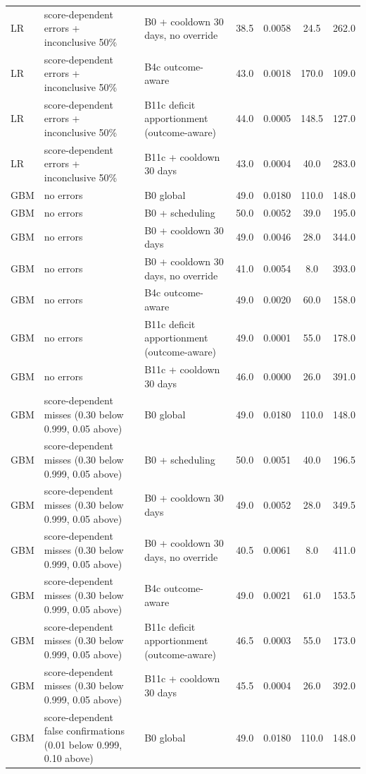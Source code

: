 \begin{longtable}{lp{5.2cm}p{4.4cm}cccc}
LR & score-dependent errors + inconclusive 50\% & B0 + cooldown 30 days, no override & 38.5 & 0.0058 & 24.5 & 262.0 \\
LR & score-dependent errors + inconclusive 50\% & B4c outcome-aware & 43.0 & 0.0018 & 170.0 & 109.0 \\
LR & score-dependent errors + inconclusive 50\% & B11c deficit apportionment (outcome-aware) & 44.0 & 0.0005 & 148.5 & 127.0 \\
LR & score-dependent errors + inconclusive 50\% & B11c + cooldown 30 days & 43.0 & 0.0004 & 40.0 & 283.0 \\
GBM & no errors & B0 global & 49.0 & 0.0180 & 110.0 & 148.0 \\
GBM & no errors & B0 + scheduling & 50.0 & 0.0052 & 39.0 & 195.0 \\
GBM & no errors & B0 + cooldown 30 days & 49.0 & 0.0046 & 28.0 & 344.0 \\
GBM & no errors & B0 + cooldown 30 days, no override & 41.0 & 0.0054 & 8.0 & 393.0 \\
GBM & no errors & B4c outcome-aware & 49.0 & 0.0020 & 60.0 & 158.0 \\
GBM & no errors & B11c deficit apportionment (outcome-aware) & 49.0 & 0.0001 & 55.0 & 178.0 \\
GBM & no errors & B11c + cooldown 30 days & 46.0 & 0.0000 & 26.0 & 391.0 \\
GBM & score-dependent misses (0.30 below 0.999, 0.05 above) & B0 global & 49.0 & 0.0180 & 110.0 & 148.0 \\
GBM & score-dependent misses (0.30 below 0.999, 0.05 above) & B0 + scheduling & 50.0 & 0.0051 & 40.0 & 196.5 \\
GBM & score-dependent misses (0.30 below 0.999, 0.05 above) & B0 + cooldown 30 days & 49.0 & 0.0052 & 28.0 & 349.5 \\
GBM & score-dependent misses (0.30 below 0.999, 0.05 above) & B0 + cooldown 30 days, no override & 40.5 & 0.0061 & 8.0 & 411.0 \\
GBM & score-dependent misses (0.30 below 0.999, 0.05 above) & B4c outcome-aware & 49.0 & 0.0021 & 61.0 & 153.5 \\
GBM & score-dependent misses (0.30 below 0.999, 0.05 above) & B11c deficit apportionment (outcome-aware) & 46.5 & 0.0003 & 55.0 & 173.0 \\
GBM & score-dependent misses (0.30 below 0.999, 0.05 above) & B11c + cooldown 30 days & 45.5 & 0.0004 & 26.0 & 392.0 \\
GBM & score-dependent false confirmations (0.01 below 0.999, 0.10 above) & B0 global & 49.0 & 0.0180 & 110.0 & 148.0 \\

\end{longtable}
